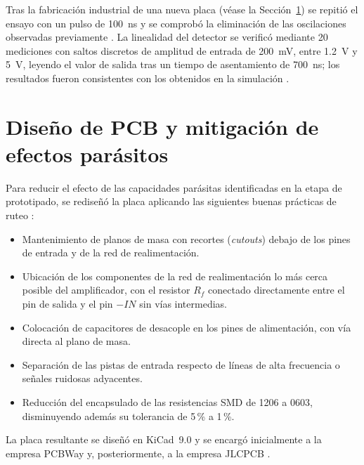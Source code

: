 Tras la fabricación industrial de una nueva placa (véase la
Sección~\ref{sec:mitigacion_parasitos}) se repitió el ensayo con un
pulso de 100~ns y se comprobó la eliminación de las oscilaciones
observadas previamente \cite{informeAbril2026}. La linealidad del
detector se verificó mediante 20 mediciones con saltos discretos de
amplitud de entrada de 200~mV, entre 1.2~V y 5~V, leyendo el valor de
salida tras un tiempo de asentamiento de 700~ns; los resultados fueron
consistentes con los obtenidos en la simulación \cite{informeAbril2026}.


\section{Diseño de PCB y mitigación de efectos parásitos}
\label{sec:mitigacion_parasitos}

Para reducir el efecto de las capacidades parásitas identificadas en la
etapa de prototipado, se rediseñó la placa aplicando las siguientes
buenas prácticas de ruteo \cite{informeMarzo2026}:

\begin{itemize}
  \item Mantenimiento de planos de masa con recortes (\emph{cutouts})
        debajo de los pines de entrada y de la red de realimentación.
  \item Ubicación de los componentes de la red de realimentación lo más
        cerca posible del amplificador, con el resistor $R_f$ conectado
        directamente entre el pin de salida y el pin $-IN$ sin vías
        intermedias.
  \item Colocación de capacitores de desacople en los pines de
        alimentación, con vía directa al plano de masa.
  \item Separación de las pistas de entrada respecto de líneas de alta
        frecuencia o señales ruidosas adyacentes.
  \item Reducción del encapsulado de las resistencias SMD de 1206 a
        0603, disminuyendo además su tolerancia de 5\,\% a 1\,\%.
\end{itemize}

La placa resultante se diseñó en KiCad~9.0
\cite{informeMarzo2026,kicad_hsrl} y se encargó inicialmente a la empresa
PCBWay y, posteriormente, a la empresa JLCPCB
\cite{informeMarzo2026,informeAbril2026}.